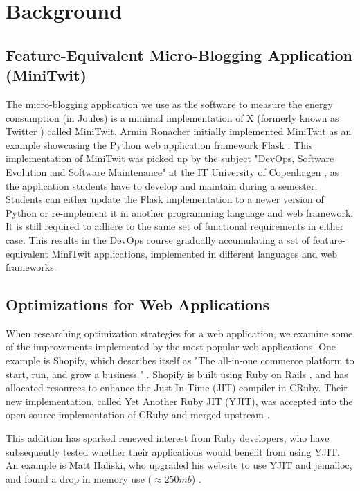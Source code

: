 \documentclass[main.tex]{subfiles}
\begin{document}
\section{Background}
\label{section:background}

\subsection{Feature-Equivalent Micro-Blogging Application (MiniTwit)}

The micro-blogging application we use as the software to measure the energy consumption (in Joules) is a minimal implementation of X (formerly known as Twitter \cite{verge-twitter-rebrand-x}) called MiniTwit. Armin Ronacher initially implemented MiniTwit as an example showcasing the Python web application framework Flask \cite{ronacher-minitwit-commit}. This implementation of MiniTwit was picked up by the subject "DevOps, Software Evolution and Software Maintenance" at the IT University of Copenhagen \cite{devops-course}, as the application students have to develop and maintain during a semester. Students can either update the Flask implementation to a newer version of Python or re-implement it in another programming language and web framework. It is still required to adhere to the same set of functional requirements in either case. This results in the DevOps course gradually accumulating a set of feature-equivalent MiniTwit applications, implemented in different languages and web frameworks.

\subsection{Optimizations for Web Applications}

When researching optimization strategies for a web application, we examine some of the improvements implemented by the most popular web applications. One example is Shopify, which describes itself as "The all-in-one commerce platform to start, run, and grow a business." \cite[see the first paragraph]{shopify-about-page}. Shopify is built using Ruby on Rails \cite{shopify-yjit}, and has allocated resources to enhance the Just-In-Time (JIT) compiler in CRuby. Their new implementation, called Yet Another Ruby JIT (YJIT), was accepted into the open-source implementation of CRuby and merged upstream \cite{shopify-yjit}.

This addition has sparked renewed interest from Ruby developers, who have subsequently tested whether their applications would benefit from using YJIT. An example is Matt Haliski, who upgraded his website to use YJIT and jemalloc, and found a drop in memory use ($\approx 250 mb$) \cite{matt-haliski-yjit-jemalloc-upgarde}.
\end{document}

